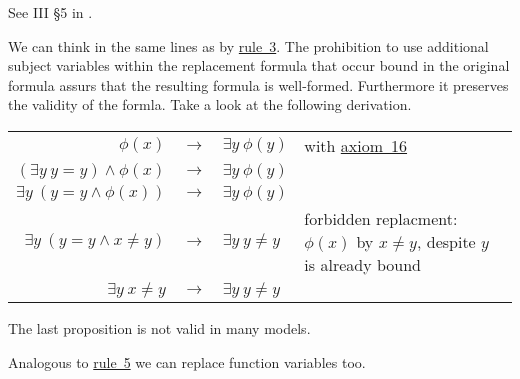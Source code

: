 \documentclass[a4paper,german,10pt,twoside]{book}
\theoremstyle{definition}
\theoremstyle{remark}
\begin{document}
See III \S 5 in \cite{hilback}.

\par
We can think in the same lines as by \hyperlink{rule:replaceFree}{rule~3}.
The prohibition to use additional subject variables within the replacement formula that occur bound in the original formula assurs that the resulting formula is well-formed. Furthermore it preserves the validity of the formla. Take a look at the following derivation.

\par
\begin{tabularx}{\linewidth}{rclX}
  $ \phi(x)$                             & $\rightarrow$ & $\exists y \ \phi(y)$  
    & with \hyperlink{axiom:existencialGeneralization}{axiom~16} \\
  $ (\exists y \ y = y) \land \phi(x)$   & $\rightarrow$ & $\exists y \ \phi(y)$  
    &  \\
  $ \exists y \ (y = y \land \phi(x))$   & $\rightarrow$ & $\exists y \ \phi(y)$  
    &  \\
  $ \exists y \ (y = y \land x \neq y)$  & $\rightarrow$ & $\exists y \ y \neq y$  
    & forbidden replacment: $\phi(x)$ by $x \neq y$, despite $y$ is already bound \\
  $ \exists y \  x \neq y$  & $\rightarrow$ & $\exists y \ y \neq y$  
    &
\end{tabularx}

\par
The last proposition is not valid in many models.


\par
Analogous to \hyperlink{rule:replacePred}{rule~5} we can replace function variables too.
\end{document}
